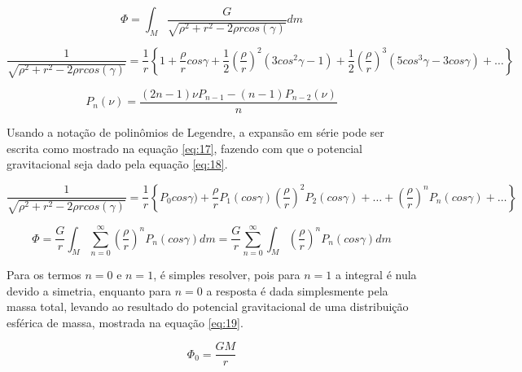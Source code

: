 \begin{equation}
    \Phi = \int_{M} \frac{G}  {\sqrt{\rho^{2} + r^{2} - 2\rho r cos(\gamma)}}   dm
\label{eq:14}
\end{equation}

\begin{equation}
    \frac{1}{\sqrt{\rho^{2} + r^{2} - 2\rho r cos(\gamma)}} = \frac{1}{r} \left\{   1 + \frac{\rho}{r} cos \gamma + \frac{1}{2} \left( \frac{\rho}{r} \right)^{2} (3cos^{2}\gamma - 1) +   \frac{1}{2} \left( \frac{\rho}{r} \right)^{3} (5cos^{3}\gamma - 3cos \gamma) + \dots                       \right\}
    \label{eq:15}
\end{equation}

\begin{equation}
    P_{n} (\nu) = \frac{(2n - 1)\nu P_{n-1} - (n-1) P_{n-2}(\nu) }       {n}
    \label{eq:16}
\end{equation}

Usando a notação de polinômios de Legendre, a expansão em série pode ser escrita como mostrado na equação \ref{eq:17}, fazendo com que o potencial gravitacional seja dado pela equação \ref{eq:18}.

\begin{equation}
    \frac{1}{\sqrt{\rho^{2} + r^{2} - 2\rho r cos(\gamma)}} = \frac{1}{r} \left\{  P_{0}cos \gamma) + \frac{\rho}{r}P_{1}(cos\gamma)   \left( \frac{\rho}{r} \right)^{2} P_{2} (cos\gamma) + \dots + 
 \left( \frac{\rho}{r} \right)^{n} P_{n} (cos\gamma) + \dots                      \right\}
    \label{eq:17}
\end{equation}

\begin{equation}
     \Phi =  \frac{G}{r}
     \int_{M}
     \sum\limits_{n=0}^{\mbox{$\infty$}}
     \left( \frac{\rho}{r}\right)^{n}
     P_{n} (cos\gamma) dm =  \frac{G}{r}
     \sum\limits_{n=0}^{\mbox{$\infty$}}
         \int_{M}
     \left( \frac{\rho}{r}\right)^{n}
     P_{n} (cos\gamma) dm
    \label{eq:18} 
\end{equation}

Para os termos $n = 0$ e $n = 1$, é simples resolver, pois para $n = 1$ a integral é nula devido a simetria, enquanto para $n = 0$ a resposta é dada simplesmente pela massa total, levando ao resultado do potencial gravitacional de uma distribuição esférica de massa, mostrada na equação \ref{eq:19}.

\begin{equation}
    \Phi_{0} = \frac{GM}{r}
    \label{eq:19}
\end{equation}

